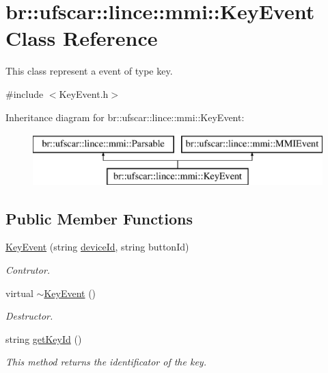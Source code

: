 \hypertarget{classbr_1_1ufscar_1_1lince_1_1mmi_1_1KeyEvent}{
\section{br::ufscar::lince::mmi::KeyEvent Class Reference}
\label{classbr_1_1ufscar_1_1lince_1_1mmi_1_1KeyEvent}
}


This class represent a event of type key.  




{\ttfamily \#include $<$KeyEvent.h$>$}

Inheritance diagram for br::ufscar::lince::mmi::KeyEvent:\begin{figure}[H]
\begin{center}
\leavevmode
\includegraphics[height=2cm]{classbr_1_1ufscar_1_1lince_1_1mmi_1_1KeyEvent}
\end{center}
\end{figure}
\subsection*{Public Member Functions}
\begin{DoxyCompactItemize}
\item 
\hyperlink{classbr_1_1ufscar_1_1lince_1_1mmi_1_1KeyEvent_a6a6e61334c0e04dd3b43562dce2a107f}{KeyEvent} (string \hyperlink{classbr_1_1ufscar_1_1lince_1_1mmi_1_1MMIEvent_ab49d18c433659ed8e7dbdaa9004839d5}{deviceId}, string buttonId)
\begin{DoxyCompactList}\small\item\em Contrutor. \item\end{DoxyCompactList}\item 
virtual \hyperlink{classbr_1_1ufscar_1_1lince_1_1mmi_1_1KeyEvent_aadcb079c5602a9bc98dfdbc2f90bd500}{$\sim$KeyEvent} ()
\begin{DoxyCompactList}\small\item\em Destructor. \item\end{DoxyCompactList}\item 
string \hyperlink{classbr_1_1ufscar_1_1lince_1_1mmi_1_1KeyEvent_a4277d9938693821db5db50942f98fcb5}{getKeyId} ()
\begin{DoxyCompactList}\small\item\em This method returns the identificator of the key. \item\end{DoxyCompactList}\end{DoxyCompactItemize}
